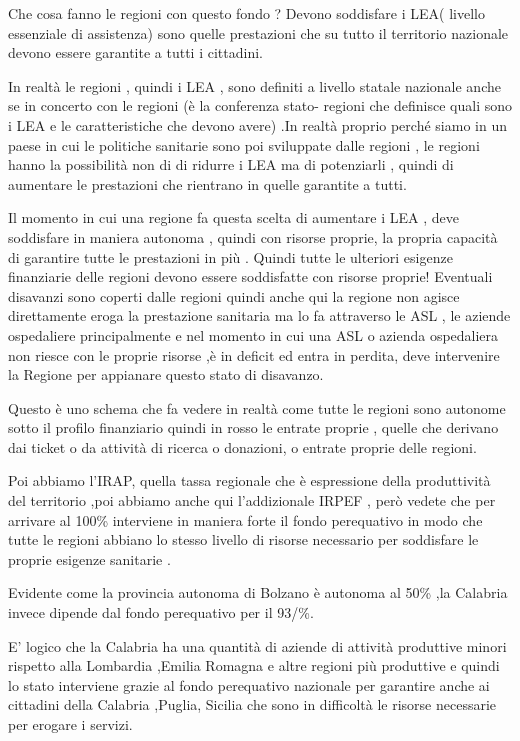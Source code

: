Che cosa fanno le regioni con questo fondo ? Devono soddisfare i LEA(
livello essenziale di assistenza) sono quelle prestazioni che su tutto
il territorio nazionale devono essere garantite a tutti i cittadini.

In realtà le regioni , quindi i LEA , sono definiti a livello statale
nazionale anche se in concerto con le regioni (è la conferenza stato-
regioni che definisce quali sono i LEA e le caratteristiche che devono
avere) .In realtà proprio perché siamo in un paese in cui le politiche
sanitarie sono poi sviluppate dalle regioni , le regioni hanno la
possibilità non di di ridurre i LEA ma di potenziarli , quindi di
aumentare le prestazioni che rientrano in quelle garantite a tutti.

Il momento in cui una regione fa questa scelta di aumentare i LEA , deve
soddisfare in maniera autonoma , quindi con risorse proprie, la propria
capacità di garantire tutte le prestazioni in più . Quindi tutte le
ulteriori esigenze finanziarie delle regioni devono essere soddisfatte
con risorse proprie! Eventuali disavanzi sono coperti dalle regioni
quindi anche qui la regione non agisce direttamente eroga la prestazione
sanitaria ma lo fa attraverso le ASL , le aziende ospedaliere
principalmente e nel momento in cui una ASL o azienda ospedaliera non
riesce con le proprie risorse ,è in deficit ed entra in perdita, deve
intervenire la Regione per appianare questo stato di disavanzo.

Questo è uno schema che fa vedere in realtà come tutte le regioni sono
autonome sotto il profilo finanziario quindi in rosso le entrate proprie
, quelle che derivano dai ticket o da attività di ricerca o donazioni, o
entrate proprie delle regioni.

Poi abbiamo l'IRAP, quella tassa regionale che è espressione della
produttività del territorio ,poi abbiamo anche qui l'addizionale IRPEF ,
però vedete che per arrivare al 100\% interviene in maniera forte il
fondo perequativo in modo che tutte le regioni abbiano lo stesso livello
di risorse necessario per soddisfare le proprie esigenze sanitarie .

Evidente come la provincia autonoma di Bolzano è autonoma al 50\% ,la
Calabria invece dipende dal fondo perequativo per il 93/\%.

E' logico che la Calabria ha una quantità di aziende di attività
produttive minori rispetto alla Lombardia ,Emilia Romagna e altre
regioni più produttive e quindi lo stato interviene grazie al fondo
perequativo nazionale per garantire anche ai cittadini della Calabria
,Puglia, Sicilia che sono in difficoltà le risorse necessarie per
erogare i servizi.

